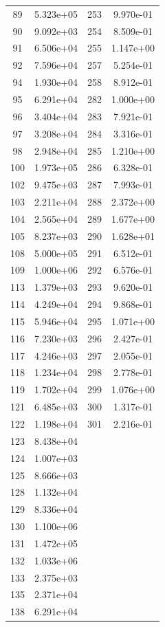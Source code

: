 \documentclass[12pt]{article}
\begin{document}
\begin{longtable}{@{}cccc@{}}
89 & 5.323e+05 & 253 & 9.970e-01 \\
90 & 9.092e+03 & 254 & 8.509e-01 \\
91 & 6.506e+04 & 255 & 1.147e+00 \\
92 & 7.596e+04 & 257 & 5.254e-01 \\
94 & 1.930e+04 & 258 & 8.912e-01 \\
95 & 6.291e+04 & 282 & 1.000e+00 \\
96 & 3.404e+04 & 283 & 7.921e-01 \\
97 & 3.208e+04 & 284 & 3.316e-01 \\
98 & 2.948e+04 & 285 & 1.210e+00 \\
100 & 1.973e+05 & 286 & 6.328e-01 \\
102 & 9.475e+03 & 287 & 7.993e-01 \\
103 & 2.211e+04 & 288 & 2.372e+00 \\
104 & 2.565e+04 & 289 & 1.677e+00 \\
105 & 8.237e+03 & 290 & 1.628e+01 \\
108 & 5.000e+05 & 291 & 6.512e-01 \\
109 & 1.000e+06 & 292 & 6.576e-01 \\
113 & 1.379e+03 & 293 & 9.620e-01 \\
114 & 4.249e+04 & 294 & 9.868e-01 \\
115 & 5.946e+04 & 295 & 1.071e+00 \\
116 & 7.230e+03 & 296 & 2.427e-01 \\
117 & 4.246e+03 & 297 & 2.055e-01 \\
118 & 1.234e+04 & 298 & 2.778e-01 \\
119 & 1.702e+04 & 299 & 1.076e+00 \\
121 & 6.485e+03 & 300 & 1.317e-01 \\
122 & 1.198e+04 & 301 & 2.216e-01 \\
123 & 8.438e+04 &  &  \\
124 & 1.007e+03 &  &  \\
125 & 8.666e+03 &  &  \\
128 & 1.132e+04 &  &  \\
129 & 8.336e+04 &  &  \\
130 & 1.100e+06 &  &  \\
131 & 1.472e+05 &  &  \\
132 & 1.033e+06 &  &  \\
133 & 2.375e+03 &  &  \\
135 & 2.371e+04 &  &  \\
138 & 6.291e+04 &  &  \\

\end{longtable}
\end{document}
